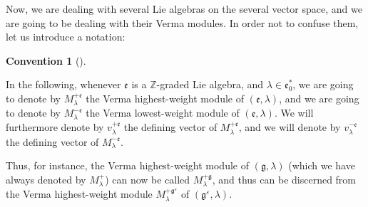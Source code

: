 \documentclass
[numbers=enddot,12pt,final,onecolumn,german,notitlepage]{scrartcl}%
\theoremstyle{definition}
\newtheorem{conv}[theo]{Convention}
\newenvironment{Convention}[1][]
{\begin{conv}[#1]\begin{leftbar}}
{\end{leftbar}\end{conv}}
\begin{document}
Now, we are dealing with several Lie algebras on the several vector space, and
we are going to be dealing with their Verma modules. In order not to confuse
them, let us introduce a notation:

\begin{Convention}
In the following, whenever $\mathfrak{e}$ is a $\mathbb{Z}$-graded Lie
algebra, and $\lambda\in\mathfrak{e}_{0}^{\ast}$, we are going to denote by
$M_{\lambda}^{+\mathfrak{e}}$ the Verma highest-weight module of $\left(
\mathfrak{e},\lambda\right)  $, and we are going to denote by $M_{\lambda
}^{-\mathfrak{e}}$ the Verma lowest-weight module of $\left(  \mathfrak{e}%
,\lambda\right)  $. We will furthermore denote by $v_{\lambda}^{+\mathfrak{e}%
}$ the defining vector of $M_{\lambda}^{+\mathfrak{e}}$, and we will denote by
$v_{\lambda}^{-\mathfrak{e}}$ the defining vector of $M_{\lambda
}^{-\mathfrak{e}}$.
\end{Convention}

Thus, for instance, the Verma highest-weight module of $\left(  \mathfrak{g}%
,\lambda\right)  $ (which we have always denoted by $M_{\lambda}^{+}$) can now
be called $M_{\lambda}^{+\mathfrak{g}}$, and thus can be discerned from the
Verma highest-weight module $M_{\lambda}^{+\mathfrak{g}^{\varepsilon}}$ of
$\left(  \mathfrak{g}^{\varepsilon},\lambda\right)  $.
\end{document}
